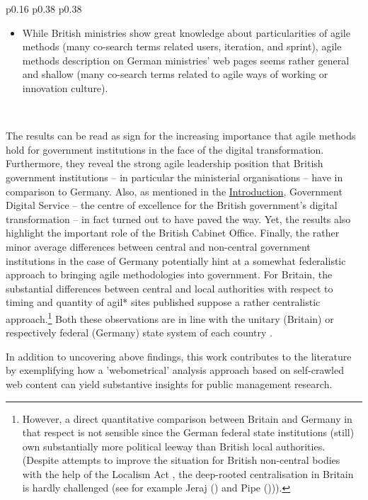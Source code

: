 \begin{spacing}{.9}
\begin{longtable}[ht!]{p{0.16\textwidth} p{0.38\textwidth} p{0.38\textwidth}}
{\begin{minipage}[t]{\linewidth}
\begin{itemize}[nosep, wide=0pt, leftmargin=*, after=\strut]
    \item While British ministries show great knowledge about particularities of agile methods (many co-search terms related users, iteration, and sprint), agile methods description on German ministries' web pages seems rather general and shallow (many co-search terms related to agile ways of working or innovation culture).
    \end{itemize}
    \end{minipage}}\\
    \hline
\end{longtable}
\end{spacing}
\endgroup
\vspace{-0.1cm}


The results can be read as sign for the increasing importance that agile methods hold for government institutions in the face of the digital transformation. Furthermore, they reveal the strong agile leadership position that British government institutions – in particular the ministerial organisations – have in comparison to Germany. Also, as mentioned in the \hyperref[Introduction]{Introduction}, Government Digital Service – the centre of excellence for the British government's digital transformation – in fact turned out to have paved the way. Yet, the results also highlight the important role of the British Cabinet Office. Finally, the rather minor average differences between central and non-central government institutions in the case of Germany potentially hint at a somewhat federalistic approach to bringing agile methodologies into government. For Britain, the substantial differences between central and local authorities with respect to timing and quantity of agil* sites published suppose a rather centralistic approach.\footnote{However, a direct quantitative comparison between Britain and Germany in that respect is not sensible since the German federal state institutions (still) own substantially more political leeway than British local authorities. (Despite attempts to improve the situation for British non-central bodies with the help of the Localism Act \parencite{Legislation.gov.uk2011}, the deep-rooted centralisation in Britain is hardly challenged (see for example Jeraj (\cite*{Jeraj2013}) and Pipe (\cite*{ Pipe2013}))).} Both these observations are in line with the unitary (Britain) or respectively federal (Germany) state system of each country \parencite{Elazar1997}. 

In addition to uncovering above findings, this work contributes to the literature by exemplifying how a 'webometrical' analysis approach \parencite{Thelwall2009} based on self-crawled web content can yield substantive insights for public management research. 

